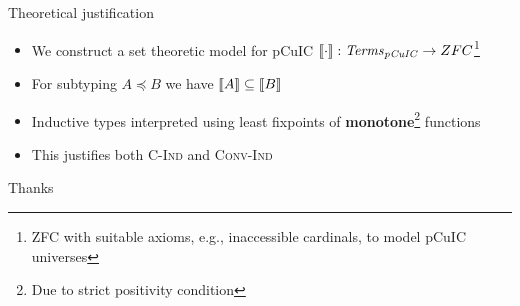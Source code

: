\documentclass[xcolor=dvipsnames]{beamer}
\begin{document}
\begin{frame}[t]{Theoretical justification}
\begin{itemize}
\item We construct a set theoretic model for pCuIC $\llbracket \cdot \rrbracket: \mathit{Terms}_\mathit{pCuIC} \to ZFC$\footnote{ZFC with suitable axioms, e.g., inaccessible cardinals, to model pCuIC universes}
\item For subtyping $A \preceq B$ we have $\llbracket A \rrbracket \subseteq \llbracket B \rrbracket$
\item Inductive types interpreted using least fixpoints of \textbf{monotone}\footnote{Due to strict positivity condition} functions
\item This justifies both \textsc{C-Ind} and \textsc{Conv-Ind}
\end{itemize}
\end{frame}

\begin{frame}
\centering
\Huge Thanks
\end{frame}
\end{document}
